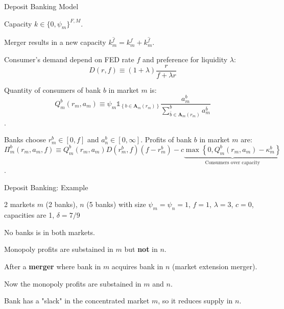 \documentclass[notes,10.2pt, aspectratio=169]{beamer}
\newenvironment{wideitemize}{\itemize\addtolength{\itemsep}{10pt}}{\enditemize}
\begin{document}
\begin{frame}{  Deposit Banking Model}
  \vspace{0.2cm}
\begin{wideitemize}
  \item Capacity $k \in \{ 0, \psi_m\}^{F,M}$.

  \item Merger results in a new capacity $k^{\hat{f}}_m = k^f_m + k^{\hat{f}}_m$.
  \item Consumer's demand depend on FED rate $f$ and preference for liquidity $\lambda$:
  $$D(r, f) \equiv(1+\lambda) \frac{r}{f+\lambda r}$$
  \item Quantity of consumers of bank $b$ in market $m$ is:
  $$Q_m^b\left(r_m, a_m\right) \equiv \psi_m \mathbb{1}_{\left\{b \in \mathbf{A}_m\left(r_m\right)\right\}} \frac{a_m^b}{\sum_{\bar{b} \in \mathbf{A}_m\left(r_m\right)}^b a_m^{\bar{b}}}$$.
  \item Banks choose $r_m^b \in [0,f]$ and $a_n^b \in [0,\infty]$. Profits of bank $b$ in market $m$ are:
  $$\Pi_m^b\left(r_m, a_m, f\right) \equiv {Q_m^b\left(r_m, a_m\right)} D\left(r_m^b, f\right) \left(f-r_m^b\right) -c \underbrace{\max \left\{0, Q_m^b\left(r_m, a_m\right)-\kappa_m^b\right\}}_{\text{Consumers over capacity}}$$.

\end{wideitemize}

  \end{frame}
  

  \begin{frame}{Deposit Banking: Example}
    \begin{wideitemize}
      \item 2 markets $m$ (2 banks), $n$ (5 banks) with size $\psi_m = \psi_n = 1$,  
       $f = 1$, $\lambda = 3$, $c = 0$, capacities are 1, $\delta = 7/9$
       \item No banks is in both markets.
       \item Monopoly profits are substained in $m$ but \textbf{not} in $n$. %
  \pause
       \item After a \textbf{merger} where bank in $m$ acquires bank in $n$ (market extension merger).
       
       \item Now the monopoly profits are substained in $m$ and $n$.
  
      \item Bank has a "slack" in the concentrated market $m$, so it reduces supply in $n$.
    
    \end{wideitemize}
  
  \end{frame}
  
\end{document}
